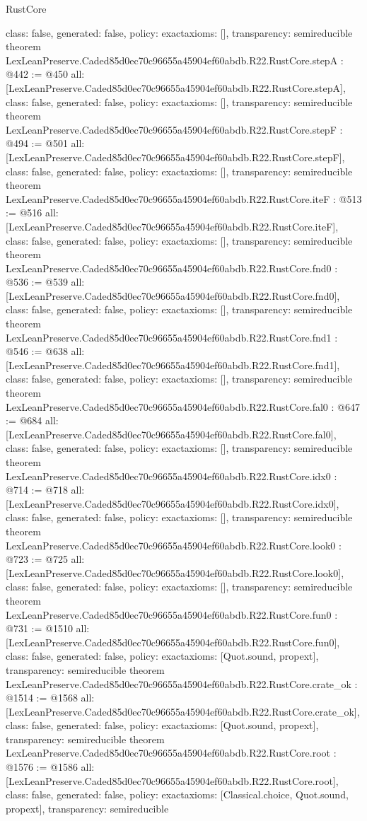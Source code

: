 \begin{lexlean}{RustCore}
\begin{coremodule}
{  class: false,
  generated: false,
  policy: exact{axioms: []},
  transparency: semireducible
}
theorem LexLeanPreserve.Caded85d0ec70c96655a45904ef60abdb.R22.RustCore.stepA : @442 := @450 {
  all: [LexLeanPreserve.Caded85d0ec70c96655a45904ef60abdb.R22.RustCore.stepA],
  class: false,
  generated: false,
  policy: exact{axioms: []},
  transparency: semireducible
}
theorem LexLeanPreserve.Caded85d0ec70c96655a45904ef60abdb.R22.RustCore.stepF : @494 := @501 {
  all: [LexLeanPreserve.Caded85d0ec70c96655a45904ef60abdb.R22.RustCore.stepF],
  class: false,
  generated: false,
  policy: exact{axioms: []},
  transparency: semireducible
}
theorem LexLeanPreserve.Caded85d0ec70c96655a45904ef60abdb.R22.RustCore.iteF : @513 := @516 {
  all: [LexLeanPreserve.Caded85d0ec70c96655a45904ef60abdb.R22.RustCore.iteF],
  class: false,
  generated: false,
  policy: exact{axioms: []},
  transparency: semireducible
}
theorem LexLeanPreserve.Caded85d0ec70c96655a45904ef60abdb.R22.RustCore.fnd0 : @536 := @539 {
  all: [LexLeanPreserve.Caded85d0ec70c96655a45904ef60abdb.R22.RustCore.fnd0],
  class: false,
  generated: false,
  policy: exact{axioms: []},
  transparency: semireducible
}
theorem LexLeanPreserve.Caded85d0ec70c96655a45904ef60abdb.R22.RustCore.fnd1 : @546 := @638 {
  all: [LexLeanPreserve.Caded85d0ec70c96655a45904ef60abdb.R22.RustCore.fnd1],
  class: false,
  generated: false,
  policy: exact{axioms: []},
  transparency: semireducible
}
theorem LexLeanPreserve.Caded85d0ec70c96655a45904ef60abdb.R22.RustCore.fal0 : @647 := @684 {
  all: [LexLeanPreserve.Caded85d0ec70c96655a45904ef60abdb.R22.RustCore.fal0],
  class: false,
  generated: false,
  policy: exact{axioms: []},
  transparency: semireducible
}
theorem LexLeanPreserve.Caded85d0ec70c96655a45904ef60abdb.R22.RustCore.idx0 : @714 := @718 {
  all: [LexLeanPreserve.Caded85d0ec70c96655a45904ef60abdb.R22.RustCore.idx0],
  class: false,
  generated: false,
  policy: exact{axioms: []},
  transparency: semireducible
}
theorem LexLeanPreserve.Caded85d0ec70c96655a45904ef60abdb.R22.RustCore.look0 : @723 := @725 {
  all: [LexLeanPreserve.Caded85d0ec70c96655a45904ef60abdb.R22.RustCore.look0],
  class: false,
  generated: false,
  policy: exact{axioms: []},
  transparency: semireducible
}
theorem LexLeanPreserve.Caded85d0ec70c96655a45904ef60abdb.R22.RustCore.fun0 : @731 := @1510 {
  all: [LexLeanPreserve.Caded85d0ec70c96655a45904ef60abdb.R22.RustCore.fun0],
  class: false,
  generated: false,
  policy: exact{axioms: [Quot.sound, propext]},
  transparency: semireducible
}
theorem LexLeanPreserve.Caded85d0ec70c96655a45904ef60abdb.R22.RustCore.crate_ok : @1514 := @1568 {
  all: [LexLeanPreserve.Caded85d0ec70c96655a45904ef60abdb.R22.RustCore.crate_ok],
  class: false,
  generated: false,
  policy: exact{axioms: [Quot.sound, propext]},
  transparency: semireducible
}
theorem LexLeanPreserve.Caded85d0ec70c96655a45904ef60abdb.R22.RustCore.root : @1576 := @1586 {
  all: [LexLeanPreserve.Caded85d0ec70c96655a45904ef60abdb.R22.RustCore.root],
  class: false,
  generated: false,
  policy: exact{axioms: [Classical.choice, Quot.sound, propext]},
  transparency: semireducible
}


\end{coremodule}
\end{lexlean}
